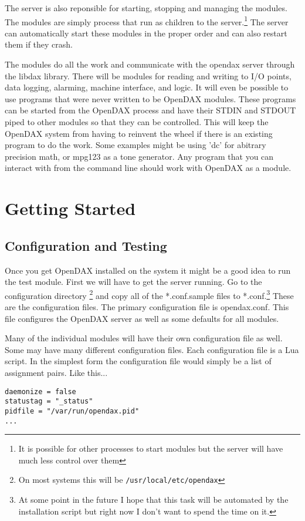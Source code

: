 The server is also reponsible for starting, stopping and managing the modules.  The modules are simply process that run as children to the server.\footnote{It is possible for other processes to start modules but the server will have much less control over them}  The server can automatically start these modules in the proper order and can also restart them if they crash.

The modules do all the work and communicate with the opendax server through the libdax library. There will be modules for reading and writing to I/O points, data logging, alarming, machine interface, and logic. It will even be possible to use programs that were never written to be OpenDAX modules. These programs can be started from the OpenDAX process and have their STDIN and STDOUT piped to other modules so that they can be controlled. This will keep the OpenDAX system from having to reinvent the wheel if there is an existing program to do the work. Some examples might be using 'dc' for abitrary precision math, or mpg123 as a tone generator. Any program that you can interact with from the command line should work with OpenDAX as a module. 

\chapter{Getting Started}


\section{Configuration and Testing}

Once you get OpenDAX installed on the system it might be a good idea to run the test module.  First we will have to get the server running.  Go to the configuration directory \footnote{On most systems this will be \texttt{/usr/local/etc/opendax}} and copy all of the *.conf.sample files to *.conf.\footnote{At some point in the future I hope that this task will be automated by the installation script but right now I don't want to spend the time on it.}   These are the configuration files.  The primary configuration file is opendax.conf.  This file configures the OpenDAX server as well as some defaults for all modules.

Many of the individual modules will have their own configuration file as well.  Some may have many different configuration files.  Each configuration file is a Lua script.  In the simplest form the configuration file would simply be a list of assignment pairs. Like this...
\begin{verbatim}
daemonize = false
statustag = "_status"
pidfile = "/var/run/opendax.pid"
... 
\end{verbatim}

